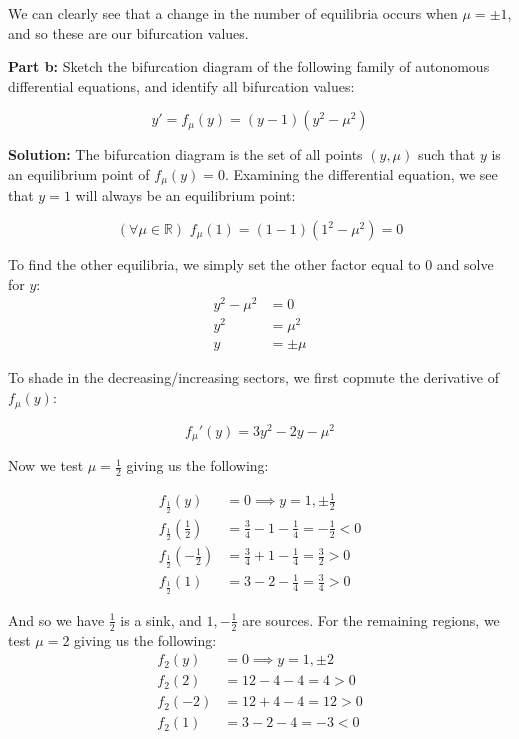 \documentclass{article}
\begin{document}
We can clearly see that a change in the number of equilibria occurs when $\mu=\pm 1$, and so these are our bifurcation values.
\bigskip

\noindent\textbf{Part b:} Sketch the bifurcation diagram of the following family of autonomous differential equations, and identify all bifurcation values:

\begin{equation*}
    y'=f_\mu(y)=(y-1)(y^2-\mu^2)
\end{equation*}

\noindent\textbf{Solution:} The bifurcation diagram is the set of all points $(y,\mu)$ such that $y$ is an equilibrium point of $f_\mu(y)=0$. Examining the differential equation, we see that $y=1$ will always be an equilibrium point:

\begin{equation*}
    (\forall\mu\in\mathbb R)\,\,f_\mu(1)=(1-1)(1^2-\mu^2)=0
\end{equation*}

To find the other equilibria, we simply set the other factor equal to 0 and solve for $y$:
\begin{align*}
    y^2-\mu^2&=0\\
    y^2&=\mu^2\\
    y&=\pm\mu
\end{align*}

To shade in the decreasing/increasing sectors, we first copmute the derivative of $f_\mu(y)$:

\begin{equation*}
    f_\mu'(y)=3y^2-2y-\mu^2
\end{equation*}

Now we test $\mu=\frac{1}{2}$ giving us the following:

\begin{align*}
    f_\frac{1}{2}(y)&=0\implies y=1,\pm\frac{1}{2}\\
    f_\frac{1}{2}\left(\frac{1}{2}\right)&=\frac{3}{4}-1-\frac{1}{4}=-\frac{1}{2}<0\\
    f_\frac{1}{2}\left(-\frac{1}{2}\right)&=\frac{3}{4}+1-\frac{1}{4}=\frac{3}{2}>0\\
    f_\frac{1}{2}(1)&=3-2-\frac{1}{4}=\frac{3}{4}>0
\end{align*}

And so we have $\frac{1}{2}$ is a sink, and $1,-\frac{1}{2}$ are sources. For the remaining regions, we test $\mu=2$ giving us the following:
\begin{align*}
    f_2(y)&=0\implies y=1,\pm2\\
    f_2(2)&=12-4-4=4>0\\
    f_2(-2)&=12+4-4=12>0\\
    f_2(1)&=3-2-4=-3<0
\end{align*}
\end{document}

